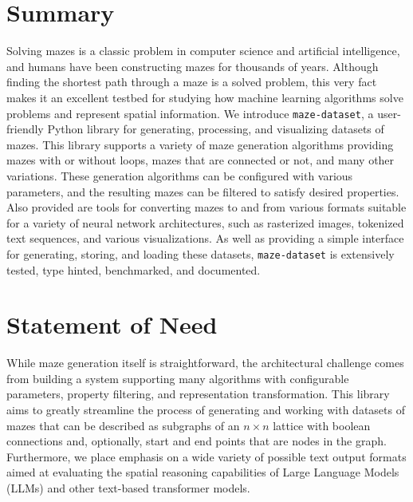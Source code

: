 \documentclass[10pt,a4paper,onecolumn]{article}
\let\origfigure\figure
\let\endorigfigure\endfigure
\renewenvironment{figure}[1][2] {
    \expandafter\origfigure\expandafter[H]
} {
    \endorigfigure
}
\begin{document}
\hypertarget{summary}{%
\section{Summary}\label{summary}}

Solving mazes is a classic problem in computer science and artificial
intelligence, and humans have been constructing mazes for thousands of
years. Although finding the shortest path through a maze is a solved
problem, this very fact makes it an excellent testbed for studying how
machine learning algorithms solve problems and represent spatial
information. We introduce \texttt{maze-dataset}, a user-friendly Python
library for generating, processing, and visualizing datasets of mazes.
This library supports a variety of maze generation algorithms providing
mazes with or without loops, mazes that are connected or not, and many
other variations. These generation algorithms can be configured with
various parameters, and the resulting mazes can be filtered to satisfy
desired properties. Also provided are tools for converting mazes to and
from various formats suitable for a variety of neural network
architectures, such as rasterized images, tokenized text sequences, and
various visualizations. As well as providing a simple interface for
generating, storing, and loading these datasets, \texttt{maze-dataset}
is extensively tested, type hinted, benchmarked, and documented.

\begin{figure} 
  \begin{minipage}{5in}
     
  \end{minipage}
  \caption{
    Usage of maze-dataset. We create a \texttt{MazeDataset} from a \texttt{MazeDatasetConfig}. This contains \texttt{SolvedMaze} objects which can be converted to and from a variety of formats. Code in the image contains clickable links to \href{https://understanding-search.github.io/maze-dataset/maze_dataset.html}{documentation}. A variety of generated examples can be viewed \href{https://understanding-search.github.io/maze-dataset/examples/maze_examples.html}{here}.
  }
  \label{fig:diagram}
\end{figure}

\hypertarget{statement-of-need}{%
\section{Statement of Need}\label{statement-of-need}}

While maze generation itself is straightforward, the architectural
challenge comes from building a system supporting many algorithms with
configurable parameters, property filtering, and representation
transformation. This library aims to greatly streamline the process of
generating and working with datasets of mazes that can be described as
subgraphs of an \(n \times n\) lattice with boolean connections and,
optionally, start and end points that are nodes in the graph.
Furthermore, we place emphasis on a wide variety of possible text output
formats aimed at evaluating the spatial reasoning capabilities of Large
Language Models (LLMs) and other text-based transformer models.
\end{document}

